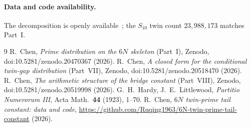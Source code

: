 \documentclass[11pt]{article}
\begin{document}
\paragraph{Data and code availability.}
The decomposition is openly available~\cite{repo}; the $S_{10}$ twin count
$23{,}988{,}173$ matches Part~I.

\begin{thebibliography}{9}
 R.~Chen, \emph{Prime distribution on the $6N$ skeleton} (Part~I),
Zenodo, doi:10.5281/zenodo.20470367 (2026).
 R.~Chen, \emph{A closed form for the conditional twin-gap
distribution} (Part~VII), Zenodo, doi:10.5281/zenodo.20518470 (2026).
 R.~Chen, \emph{The arithmetic structure of the bridge
constant} (Part~VIII), Zenodo, doi:10.5281/zenodo.20519998 (2026).
 G.~H.~Hardy, J.~E.~Littlewood, \emph{Partitio Numerorum III}, Acta
Math.\ \textbf{44} (1923), 1--70.
 R.~Chen, \emph{$6N$ twin-prime tail constant: data and code},
\url{https://github.com/Ruqing1963/6N-twin-prime-tail-constant} (2026).
\end{thebibliography}
\end{document}
